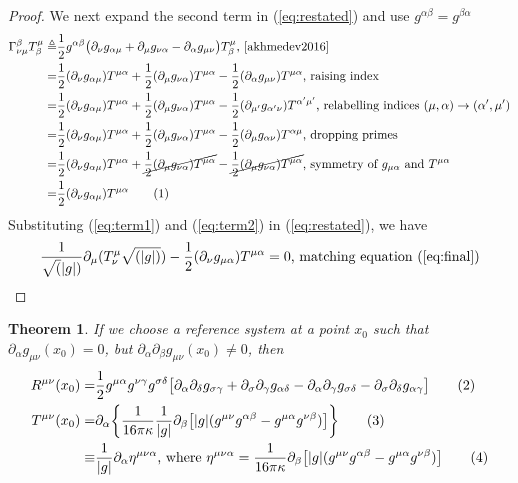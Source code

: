 \documentclass[]{article}
\newtheorem{theorem}{Theorem}
\newcommand\numberthis{\addtocounter{equation}{1}\tag{\theequation}}
\begin{document}
\begin{proof}
	We next expand the second term in (\ref{eq:restated}) and use $g^{\alpha\beta}=g^{\beta\alpha}$ 
	\begin{align*}
	\Gamma^{\beta}_{\nu\mu}T^{\mu}_{\beta} \triangleq& \frac{1}{2} g^{\alpha\beta} \big( \partial_{\nu}g_{\alpha\mu} + \partial_{\mu}g_{\nu\alpha} - \partial_{\alpha}g_{\mu\nu}\big) T^{\mu}_{\beta}\text{, \cite[(46)]{akhmedev2016}}\\
	=&\frac{1}{2} (\partial_{\nu}g_{\alpha\mu})T^{\mu\alpha} + \frac{1}{2}  (\partial_{\mu}g_{\nu\alpha})T^{\mu\alpha} - \frac{1}{2}  (\partial_{\alpha}g_{\mu\nu}) T^{\mu\alpha}\text{, raising index}\\
	=&\frac{1}{2} (\partial_{\nu}g_{\alpha\mu})T^{\mu\alpha} + \frac{1}{2}  (\partial_{\mu}g_{\nu\alpha})T^{\mu\alpha} - \frac{1}{2}  (\partial_{\mu'}g_{\alpha'\nu}) T^{\alpha'\mu'}\text{, relabelling indices } (\mu,\alpha)\rightarrow(\alpha',\mu')\\
	=&\frac{1}{2} (\partial_{\nu}g_{\alpha\mu})T^{\mu\alpha} + \frac{1}{2}  (\partial_{\mu}g_{\nu\alpha})T^{\mu\alpha} - \frac{1}{2}  (\partial_{\mu}g_{\alpha\nu}) T^{\alpha\mu} \text{, dropping primes}\\
	=&\frac{1}{2} (\partial_{\nu}g_{\alpha\mu})T^{\mu\alpha} + \cancel{\frac{1}{2}  (\partial_{\mu}g_{\nu\alpha})T^{\mu\alpha}} - \cancel{\frac{1}{2}  (\partial_{\mu}g_{\nu\alpha}) T^{\mu\alpha}}\text{, symmetry of $g_{\mu\alpha}$ and $T^{\mu\alpha}$}\\
	=&\frac{1}{2} (\partial_{\nu}g_{\alpha\mu})T^{\mu\alpha} \numberthis\label{eq:term2}
	\end{align*}
	Substituting (\ref{eq:term1}) and (\ref{eq:term2}) in (\ref{eq:restated}), we have
	\begin{equation*}
	\frac{1}{\sqrt(|g|)}\partial_{\mu}(T^{\mu}_{\nu}\sqrt{(|g|)}) - \frac{1}{2}(\partial_{\nu}g_{\mu\alpha})T^{\mu\alpha}=0\text{, matching equation (\ref{eq:final})}
	\end{equation*}
\end{proof}

\begin{theorem}
	If we choose a reference system at a point $x_0$ such that $\partial_{\alpha}g_{\mu\nu}(x_0)=0$, but $\partial_{\alpha}\partial_{\beta}g_{\mu\nu}(x_0)\neq0$, then
	\begin{align*}
	R^{\mu\nu}(x_0) = & \frac{1}{2}g^{\mu\alpha}g^{\nu\gamma}g^{\sigma\delta}\big[\partial_{\alpha}\partial_{\delta}g_{\sigma\gamma} + \partial_{\sigma}\partial_{\gamma}g_{\alpha\delta} - \partial_{\alpha}\partial_{\gamma}g_{\sigma\delta} - \partial_{\sigma}\partial_{\delta}g_{\alpha\gamma}\big] \numberthis\label{eq:R} \\
	T^{\mu\nu}(x_0) =& \partial_{\alpha}\bigg\{ \frac{1}{16\pi\kappa}\frac{1}{|g|}\partial_{\beta}\big[|g|(g^{\mu\nu}g^{\alpha\beta}-g^{\mu\alpha}g^{\nu\beta})\big]\bigg\} \numberthis  \label{eq:T} \\
	\equiv& \frac{1}{|g|}\partial_{\alpha}\eta^{\mu\nu\alpha} \text{, where }
	\eta^{\mu\nu\alpha} = \frac{1}{16\pi\kappa} \partial_{\beta} \big[|g|(g^{\mu\nu}g^{\alpha\beta}-g^{\mu\alpha}g^{\nu\beta})\big] \numberthis\label{eq:eta}
	\end{align*}
\end{theorem}
\end{document}
